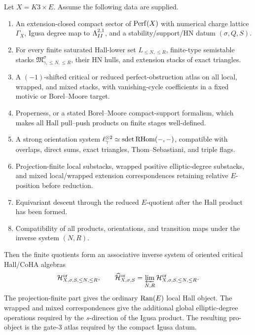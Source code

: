 \begin{theorem}
Let \(X=K3\times E\).  Assume the following data are supplied.
\begin{enumerate}
\item An extension-closed compact sector of \(\operatorname{Perf}(X)\) with numerical
charge lattice \(\Gamma_X\), Igusa degree map to \(\Lambda^{2,1}_{II}\),
and a stability/support/HN datum \((\sigma,Q,S)\).
\item For every finite saturated Hall-lower set \(L_{\leq N,\leq R}\),
finite-type semistable stacks
\(\mathfrak M^\sigma_{\gamma,\leq N,\leq R}\), their HN hulls, and
extension stacks of exact triangles.
\item A \((-1)\)-shifted critical or reduced perfect-obstruction atlas
on all local, wrapped, and mixed stacks, with vanishing-cycle
coefficients in a fixed motivic or Borel--Moore target.
\item Properness, or a stated Borel--Moore compact-support formalism,
which makes all Hall pull--push products on finite stages well-defined.
\item A strong orientation system
\(\ell_\gamma^{\otimes 2}\simeq\operatorname{sdet}\operatorname{RHom}(-,-)\), compatible with
overlaps, direct sums, exact triangles, Thom--Sebastiani, and triple
flags.
\item Projection-finite local substacks, wrapped positive
elliptic-degree substacks, and mixed local/wrapped extension
correspondences retaining relative \(E\)-position before reduction.
\item Equivariant descent through the reduced \(E\)-quotient after the
Hall product has been formed.
\item Compatibility of all products, orientations, and transition maps
under the inverse system \((N,R)\).
\end{enumerate}
Then the finite quotients form an associative inverse system of
oriented critical Hall/CoHA algebras
\[
   \mathcal H^{\mathrm{or}}_{X,\sigma,S,\leq N,\leq R},
   \qquad
   \widehat{\mathcal H}^{\mathrm{or}}_{X,\sigma,S}
   =
   \varprojlim_{N,R}
   \mathcal H^{\mathrm{or}}_{X,\sigma,S,\leq N,\leq R}.
\]
The projection-finite part gives the ordinary \(\operatorname{Ran}(E)\) local Hall
object.  The wrapped and mixed correspondences give the additional
global elliptic-degree operations required by the \(s\)-direction of
the Igusa product.  The resulting pro-object is the gate-3 atlas
required by the compact Igusa datum.
\end{theorem}

